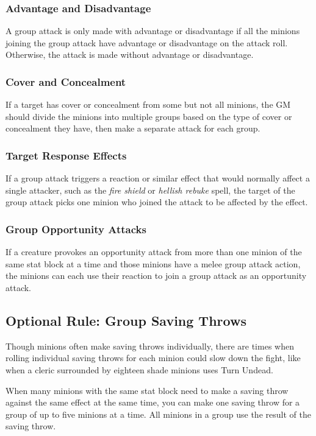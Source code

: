 \documentclass[10pt,a4paper,twoside,bg=print,twocolumn,openany,nodeprecatedcode]{dndbook}
\begin{document}
\subsubsection{Advantage and Disadvantage}
A group attack is only made with advantage or disadvantage if all the minions joining the group attack have advantage or disadvantage on the attack roll. Otherwise, the attack is made without advantage or disadvantage.

\subsubsection{Cover and Concealment}
If a target has cover or concealment from some but not all minions, the GM should divide the minions into multiple groups based on the type of cover or concealment they have, then make a separate attack for each group.

\subsubsection{Target Response Effects}
If a group attack triggers a reaction or similar effect that would normally affect a single attacker, such as the \textit{fire shield} or \textit{hellish rebuke} spell, the target of the group attack picks one minion who joined the attack to be affected by the effect.

\subsubsection{Group Opportunity Attacks}
If a creature provokes an opportunity attack from more than one minion of the same stat block at a time and those minions have a melee group attack action, the minions can each use their reaction to join a group attack as an opportunity attack.

\subsection{Optional Rule: Group Saving Throws}
Though minions often make saving throws individually, there are times when rolling individual saving throws for each minion could slow down the fight, like when a cleric surrounded by eighteen shade minions uses Turn Undead.

When many minions with the same stat block need to make a saving throw against the same effect at the same time, you can make one saving throw for a group of up to five minions at a time. All minions in a group use the result of the saving throw.
\end{document}
